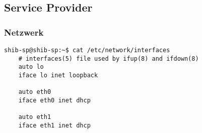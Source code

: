 \subsection{Service Provider}
\subsubsection{Netzwerk}
\begin{lstlisting}
shib-sp@shib-sp:~$ cat /etc/network/interfaces 
	# interfaces(5) file used by ifup(8) and ifdown(8)
	auto lo
	iface lo inet loopback

	auto eth0
	iface eth0 inet dhcp

	auto eth1
	iface eth1 inet dhcp
\end{lstlisting}
	
